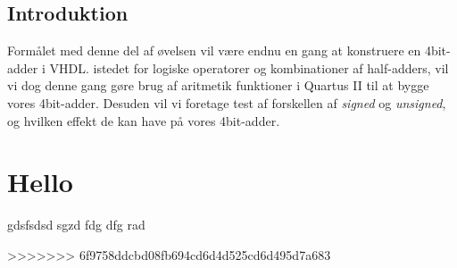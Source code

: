 \documentclass[../journal2.tex]{subfiles}
\begin{document}
\subsection{Introduktion}
Formålet med denne del af øvelsen vil være endnu en gang at konstruere en 4bit-adder i VHDL. istedet for logiske operatorer og kombinationer af half-adders, vil vi dog denne gang gøre brug af aritmetik funktioner i Quartus II til at bygge vores 4bit-adder. Desuden vil vi foretage test af forskellen af \textit{signed} og \textit{unsigned}, og hvilken effekt de kan have på vores 4bit-adder.

\section{Hello}

gdsfsdsd 
sgzd fdg dfg rad









>>>>>>> 6f9758ddcbd08fb694cd6d4d525cd6d495d7a683
\end{document}
